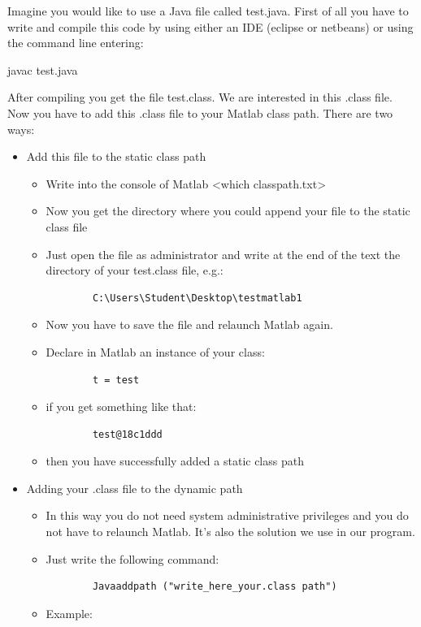 \documentclass[12pt]{article}
\begin{document}
Imagine you would like to use a Java file called test.java. First of all you have to write and compile this code by using either an IDE (eclipse or netbeans) or using the command line entering:
\begin{center}
	javac test.java 
\end{center} 
After compiling you get the file test.class. We are interested in this .class file. 
Now you have to add this .class file to your Matlab class path.
There are two ways: 
\begin{itemize}
	\item Add this file to the static class path
	\begin{itemize}
		\item Write into the console of Matlab \textless which classpath.txt\textgreater
		\item Now you get the directory where you could append your file to the static class file
		\item Just open the file as administrator and write at the end of the text the directory of your test.class file, e.g.:
		\begin{verbatim}
		C:\Users\Student\Desktop\testmatlab1
		\end{verbatim}
		\item Now you have to save the file and relaunch Matlab again.
		\item Declare in Matlab an instance of your class:
		\begin{verbatim}
		t = test 
		\end{verbatim} 
		\item if you get something like that: 
		\begin{verbatim}
		test@18c1ddd
		\end{verbatim}
		\item then you have successfully added a static class path
	\end{itemize}
	\item Adding your .class file to the dynamic path
	\begin{itemize}
		\item In this way you do not need system administrative privileges and you do not have to relaunch Matlab. It's also the solution we use in our program. 
		\item Just write the following command:
		\begin{verbatim}
		Javaaddpath ("write_here_your.class path")
		\end{verbatim}
		
		\item Example:
		

\end{itemize}
\end{itemize}
\end{document}
